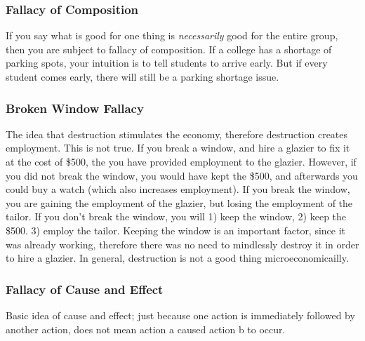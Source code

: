\documentclass[a4paper, 12pt] {article}
\begin{document}
\subsubsection{Fallacy of Composition}
If you say what is good for one thing is \emph{necessarily} good for the entire
group, then you are subject to fallacy of composition. If a college has a
shortage of parking spots, your intuition is to tell students to arrive early.
But if every student comes early, there will still be a parking shortage issue.

\subsubsection{Broken Window Fallacy}
The idea that destruction stimulates the economy, therefore destruction creates
employment. This is not true. If you break a window, and hire a glazier to fix
it at the cost of \$500, the you have provided employment to the glazier. However,
if you did not break the window, you would have kept the \$500, and afterwards
you could buy a watch (which also increases employment). If you break the window,
you are gaining the employment of the glazier, but losing the employment of the
tailor. If you don't break the window, you will 1) keep the window, 2) keep the
\$500. 3) employ the tailor. Keeping the window is an important factor, since it
was already working, therefore there was no need to mindlessly destroy it in
order to hire a glazier. In general, destruction is not a good thing
microeconomicailly.

\subsubsection{Fallacy of Cause and Effect}
Basic idea of cause and effect; just because one action is immediately followed
by another action, does not mean action a caused action b to occur.
\end{document}
